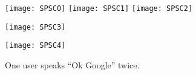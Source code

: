 
\begin{figure}[H]
	\centering
	\begin{minipage}[t]{.8\linewidth}
		\centering
		\texttt{[image: SPSC0]}
		\vspace{-.2in}
		\vspace{.2in}
		\texttt{[image: SPSC1]}
		\texttt{[image: SPSC2]}
		\vspace{-.2in}
		\vspace{.2in}
	\end{minipage}
	\begin{minipage}[t]{.45\linewidth}
		\centering
		\texttt{[image: SPSC3]}
		\vspace{-.2in}
	\end{minipage}
	\begin{minipage}[t]{.45\linewidth}
		\centering
		\texttt{[image: SPSC4]}
		\vspace{-.2in}
	\end{minipage}
	\caption{One user speaks ``Ok Google'' twice.}
	\label{fig:SPSC}
\end{figure}

